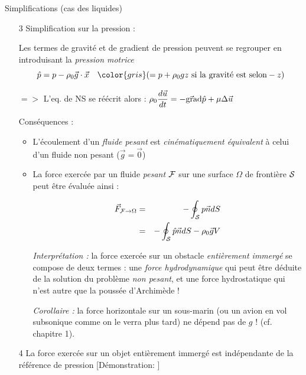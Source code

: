 \begin{frame}{Simplifications (cas des liquides)}
\small

\begin{enumerate}

\item[3] Simplification sur la pression :

\pause
Les termes de gravité et de gradient de pression peuvent se regrouper en introduisant la {\em pression motrice} 
$$
\hat{p} = p - \rho_0 \vec{g} \cdot \vec{x} \quad { \color{gris} ( = p + \rho_0 g z  \mbox{ si la gravité est selon} -z) }
$$

\pause
$=>$ L'eq. de NS se réécrit alors :
$
\displaystyle
\rho_0 \displaystyle \frac{d \vec{u}}{dt} 
= 
 - \vec{\mbox{\rm gra}}\mbox{\rm d} \hat{p} + \mu  \Delta \vec{u} 
$

\pause
Conséquences :
\begin{itemize}
\pause
\item L'écoulement d'un {\em fluide pesant} est {\em cinématiquement équivalent} à celui d'un fluide non pesant ($\vec{g}=\vec{0}$)
\pause 
\item La force exercée par un fluide {\em pesant} ${\cal F}$ sur une surface $\Omega$ de frontière $\cal S$ peut être évaluée ainsi :

\begin{eqnarray*} 
\vec{F}_{{\cal F} \rightarrow \Omega} &=& - \oint_{\cal S} p \vec{n} dS 
\\
&=&  - \oint_{\cal S} \hat{p} \vec{n} dS - \rho_0 \vec{g} V
\end{eqnarray*}
\pause 

{\em Interprétation :} la force exercée sur un obstacle {\em entièrement immergé} se compose de deux termes : une {\em force hydrodynamique}
qui peut être déduite de la solution du problème {\em non pesant}, et une force hydrostatique qui n'est autre que la poussée d'Archimède !

{\em Corollaire :} la force horizontale sur un sous-marin {\color{gris} (ou un avion en vol subsonique comme on le verra plus tard)} ne dépend pas de $g$ ! 
(cf. chapitre 1).

 \end{itemize}

\pause 
\item[4] La force exercée sur un objet entièrement immergé est indépendante de la référence de pression {\color{vert} [Démonstration: ]}

 \end{enumerate}
 
 \end{frame}


